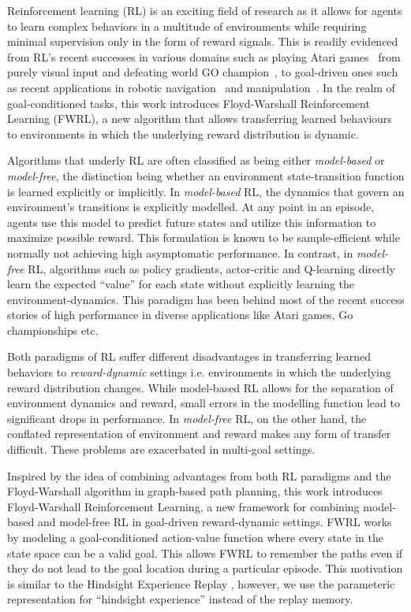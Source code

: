 Reinforcement learning (RL) is an exciting field of research as it allows for
agents to learn complex behaviors in a multitude of environments while requiring
minimal supervision only in the form of reward signals. This is readily
evidenced from RL's recent successes in various domains such as playing Atari
games~\cite{MnKaSiNATURE2015} from purely visual input and defeating world GO
champion~\cite{gibney2016google}, to goal-driven ones such as recent
applications in robotic navigation~\cite{mirowski2018learning} and
manipulation~\cite{pong2018temporal}. In the realm of goal-conditioned tasks,
this work introduces Floyd-Warshall Reinforcement Learning (FWRL), a new
algorithm that allows transferring learned behaviours to environments in which
the underlying reward distribution is dynamic.

Algorithms that underly RL are often classified as being either
\emph{model-based} or \emph{model-free}, the distinction being whether
an environment state-transition function is learned explicitly or
implicitly.  In \emph{model-based} RL, the dynamics that govern an
environment's transitions is explicitly modelled.
At any point in an episode, agents use this model to
predict future states and utilize this information to maximize possible
reward. This formulation is known to be sample-efficient while normally
not achieving high asymptomatic performance.
In contrast, in \emph{model-free} RL, algorithms such as policy gradients,
actor-critic and Q-learning directly learn the expected ``value'' for each
state without explicitly learning the environment-dynamics. This paradigm has
been behind most of the recent success stories of high performance in diverse
applications like Atari games, Go championships etc.

Both paradigms of RL suffer different disadvantages in transferring
learned behaviors to \emph{reward-dynamic} settings i.e.  environments
in which the underlying reward distribution changes.  While model-based
RL allows for the separation of environment dynamics and reward, small
errors in the modelling function lead to significant drops in
performance. In \emph{model-free} RL, on the other hand, the conflated
representation of environment and reward makes any form of transfer
difficult. These problems are exacerbated in multi-goal settings. 

Inspired by the idea of combining advantages from both RL paradigms and
the Floyd-Warshall algorithm in graph-based path planning, this work
introduces Floyd-Warshall Reinforcement Learning, a new framework for
combining model-based and model-free RL in goal-driven reward-dynamic
settings. FWRL works by modeling a goal-conditioned action-value function
where every state in the state space can be a valid goal. This allows
FWRL to remember the paths even if they do not lead to the
goal location during a particular episode.
This motivation is similar to the Hindsight Experience Replay 
\cite{anderson2017vision}, however, we use the parameteric representation
for ``hindsight experience'' instead of the replay memory.

